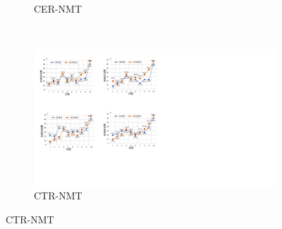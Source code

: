 \begin{figure}[!htbp]
\begin{subfigure}[b]{0.5\textwidth}
      \caption{CER-NMT}
      \label{fig:4_freq_acc_cer}
    \end{subfigure}%
    ~%
    \begin{subfigure}[b]{0.5\textwidth}
      \includegraphics[width=\textwidth]{Img/fig_4_freq_acc_ctr.pdf}
      \caption{CTR-NMT}
      \label{fig:4_freq_acc_ctr}
    \end{subfigure}
    \label{fig:4_freq_acc}
\end{figure}